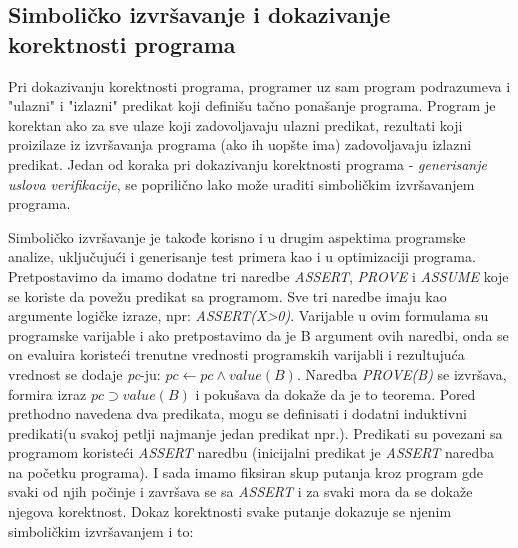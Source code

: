 \documentclass[a4paper]{article}
\begin{document}
{\subsection{Simboličko izvršavanje i dokazivanje korektnosti programa}
\label{subsec:podnaslovN}


Pri dokazivanju korektnosti programa, programer uz sam program podrazumeva i "ulazni" i "izlazni" predikat koji  definišu tačno ponašanje programa. Program je korektan ako za sve ulaze koji zadovoljavaju ulazni predikat, rezultati koji proizilaze iz izvršavanja programa (ako ih uopšte ima) zadovoljavaju izlazni predikat. Jedan od koraka pri dokazivanju korektnosti programa - \textit{generisanje uslova verifikacije}, se poprilično lako može uraditi simboličkim izvršavanjem programa.

Simboličko izvršavanje je takođe korisno i u drugim aspektima programske analize, uključujući i generisanje test primera kao i u optimizaciji programa. Pretpostavimo da imamo dodatne tri naredbe \textit{ASSERT}, \textit{PROVE} i \textit{ASSUME} koje se koriste da povežu predikat sa programom. Sve tri naredbe imaju kao argumente logičke izraze, npr: \textit{ASSERT(X>0)}. Varijable u ovim formulama su programske varijable i ako pretpostavimo da je B argument ovih naredbi, onda se on evaluira koristeći trenutne vrednosti programskih varijabli i rezultujuća vrednost se dodaje \textit{pc}-ju: $pc \gets pc \wedge value (B)$. Naredba \textit{PROVE(B)} se izvršava, formira izraz $pc \supset value(B)$ i pokušava da dokaže da je to teorema. Pored prethodno navedena dva predikata, mogu se definisati i dodatni induktivni predikati(u svakoj petlji najmanje jedan predikat npr.). Predikati su povezani sa programom koristeći \textit{ASSERT} naredbu (inicijalni predikat je \textit{ASSERT} naredba na početku programa). I sada imamo fiksiran skup putanja kroz program gde svaki od njih počinje i završava se sa \textit{ASSERT} i za svaki mora da se dokaže njegova korektnost. Dokaz korektnosti svake putanje dokazuje se njenim simboličkim izvršavanjem i to:

}
\end{document}
